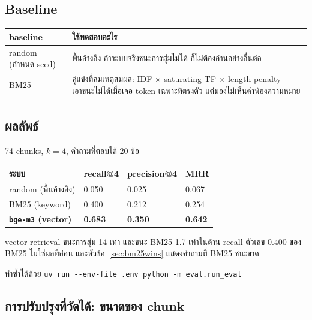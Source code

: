 \documentclass[11pt,a4paper]{article}
\newcommand{\thead}[1]{\textbf{#1}}
\newcommand{\code}[1]{\texttt{\small #1}}
\begin{document}
\subsection{Baseline}

\begin{table}[H]
\centering
\small
\begin{tabular}{@{}L{3.6cm} L{10.6cm}@{}}
\toprule
\thead{baseline} & \thead{ใช้ทดสอบอะไร} \\
\midrule
random (กำหนด seed) & พื้นอ้างอิง ถ้าระบบจริงชนะการสุ่มไม่ได้ ก็ไม่ต้องอ่านอย่างอื่นต่อ \\
BM25 & คู่แข่งที่สมเหตุสมผล: IDF $\times$ saturating TF $\times$ length penalty
เอาชนะไม่ได้เมื่อเจอ token เฉพาะที่ตรงตัว แต่มองไม่เห็นคำพ้องความหมาย \\
\bottomrule
\end{tabular}
\end{table}

\subsection{ผลลัพธ์}
\label{sec:results}

74 chunks, $k=4$, คำถามที่ตอบได้ 20 ข้อ

\begin{table}[H]
\centering
\small
\begin{tabular}{@{}L{5.2cm} C{2.6cm} C{2.6cm} C{2.6cm}@{}}
\toprule
\thead{ระบบ} & \thead{recall@4} & \thead{precision@4} & \thead{MRR} \\
\midrule
random (พื้นอ้างอิง) & 0.050 & 0.025 & 0.067 \\
BM25 (keyword)       & 0.400 & 0.212 & 0.254 \\
\textbf{\code{bge-m3} (vector)} & \textbf{0.683} & \textbf{0.350} & \textbf{0.642} \\
\bottomrule
\end{tabular}
\end{table}

vector retrieval ชนะการสุ่ม 14 เท่า และชนะ BM25 1.7 เท่าในด้าน recall
ตัวเลข 0.400 ของ BM25 ไม่ใช่ผลที่อ่อน และหัวข้อ~\ref{sec:bm25wins}
แสดงคำถามที่ BM25 ชนะขาด

ทำซ้ำได้ด้วย \code{uv run -{}-env-file .env python -m eval.run\_eval}

\subsection{การปรับปรุงที่วัดได้: ขนาดของ chunk}
\label{sec:sweep}
\end{document}
